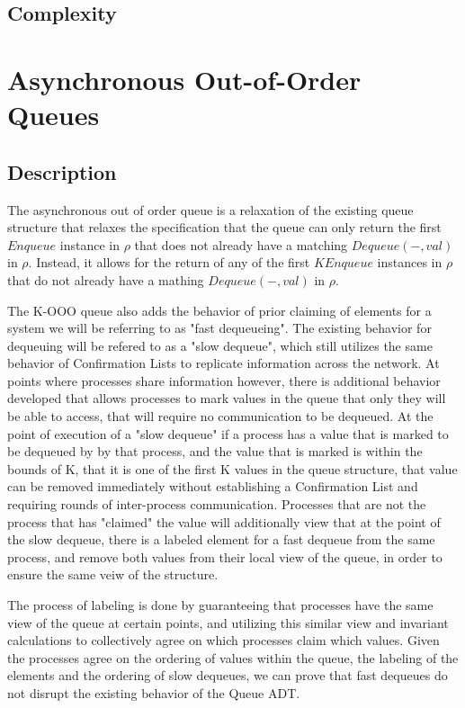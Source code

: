 \documentclass[a4paper,USenglish]{lipics-v2021} %
\begin{document}
\subsection{Complexity}

\section{Asynchronous Out-of-Order Queues}

\subsection{Description}

The asynchronous out of order queue is a relaxation of the existing queue structure that relaxes the specification that the queue can only return the first $Enqueue$ instance in $\rho$ that does not already have a matching $Dequeue(-, val)$ in $\rho$. Instead, it allows for the return of any of the first $K Enqueue$ instances in $\rho$ that do not already have a mathing $Dequeue(-, val)$ in $\rho$. 

The K-OOO queue also adds the behavior of prior claiming of elements for a system we will be referring to as "fast dequeueing". The existing behavior for dequeuing will be refered to as a "slow dequeue", which still utilizes the same behavior of Confirmation Lists to replicate information across the network. At points where processes share information however, there is additional behavior developed that allows processes to mark values in the queue that only they will be able to access, that will require no communication to be dequeued. At the point of execution of a "slow dequeue" if a process has a value that is marked to be dequeued by by that process, and the value that is marked is within the bounds of K, that it is one of the first K values in the queue structure, that value can be removed immediately without establishing a Confirmation List and requiring rounds of inter-process communication. Processes that are not the process that has "claimed" the value will additionally view that at the point of the slow dequeue, there is a labeled element for a fast dequeue from the same process, and remove both values from their local view of the queue, in order to ensure the same veiw of the structure. 

The process of labeling is done by guaranteeing that processes have the same view of the queue at certain points, and utilizing this similar view and invariant calculations to collectively agree on which processes claim which values. Given the processes agree on the ordering of values within the queue, the labeling of the elements and the ordering of slow dequeues, we can prove that fast dequeues do not disrupt the existing behavior of the Queue ADT. 
\end{document}
